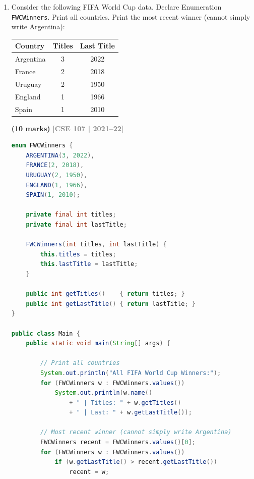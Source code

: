\documentclass[12pt,a3paper]{article}
\newcommand{\yr}[1]{\hfill\textcolor{gray}{\small\textbf{[#1]}}}
\newcommand{\mk}[1]{\textcolor{orange!70!black}{\small\textbf{(#1 marks)}}}
\begin{document}
\begin{enumerate}
\begin{tcolorbox}
\end{tcolorbox}

\item Consider the following FIFA World Cup data. Declare Enumeration \texttt{FWCWinners}. Print all countries. Print the most recent winner (cannot simply write Argentina):
\begin{center}
\begin{tabular}{lcc}
\toprule
\textbf{Country} & \textbf{Titles} & \textbf{Last Title}\\
\midrule
Argentina & 3 & 2022 \\
France & 2 & 2018 \\
Uruguay & 2 & 1950 \\
England & 1 & 1966 \\
Spain & 1 & 2010 \\
\bottomrule
\end{tabular}
\end{center}
\mk{10}
\yr{CSE 107 | 2021--22}

\begin{tcolorbox}[enhanced,breakable,ansbox,
  colback=cH!4,colframe=cH,boxrule=0.8pt,arc=5pt,
  title={\textbf{Answer --- \texttt{FWCWinners} Enumeration}},
  fonttitle=\bfseries\color{white},colbacktitle=cH]

\begin{lstlisting}[language=Java]
enum FWCWinners {
    ARGENTINA(3, 2022),
    FRANCE(2, 2018),
    URUGUAY(2, 1950),
    ENGLAND(1, 1966),
    SPAIN(1, 2010);

    private final int titles;
    private final int lastTitle;

    FWCWinners(int titles, int lastTitle) {
        this.titles = titles;
        this.lastTitle = lastTitle;
    }

    public int getTitles()    { return titles; }
    public int getLastTitle() { return lastTitle; }
}

public class Main {
    public static void main(String[] args) {

        // Print all countries
        System.out.println("All FIFA World Cup Winners:");
        for (FWCWinners w : FWCWinners.values())
            System.out.println(w.name()
                + " | Titles: " + w.getTitles()
                + " | Last: " + w.getLastTitle());

        // Most recent winner (cannot simply write Argentina)
        FWCWinners recent = FWCWinners.values()[0];
        for (FWCWinners w : FWCWinners.values())
            if (w.getLastTitle() > recent.getLastTitle())
                recent = w;


\end{lstlisting}
\end{tcolorbox}
\end{enumerate}
\end{document}
